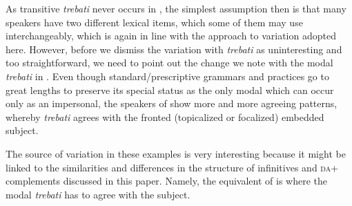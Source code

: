 \documentclass[output=paper,modfonts,newtxmath,hidelinks,]{langscibook}
\begin{document}
As transitive \textit{trebati} never occurs in , the simplest assumption then is that many  speakers have two different lexical items, which some of them may use interchangeably, which is again in line with the approach to variation adopted here. However, before we dismiss the variation with \textit{trebati} as uninteresting and too straightforward, we need to point out the change we note with the modal \textit{trebati} in . Even though standard/prescriptive grammars and practices go to great lengths to preserve its special status as the only modal which can occur only as an impersonal, the speakers of   show more and more agreeing patterns, whereby \textit{trebati} agrees with the fronted (topicalized or focalized) embedded subject.

\ea \label{7:ex19}
	\z
\z

\noindent The source of variation in these examples is very interesting because it might be linked to the similarities and differences in the structure of infinitives and \textsc{da}+ complements discussed in this paper. Namely, the  equivalent of  is  where the modal \textit{trebati} has to agree with the subject.
\end{document}
